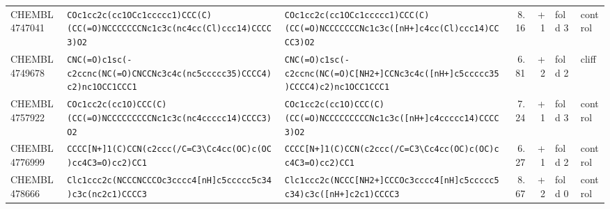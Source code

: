 \begin{longtable}{l p{4.4cm} p{4.4cm} r r l l}
CHEMBL4747041 & \texttt{COc1cc2c(\allowbreak{}cc1OCc1ccccc1)\allowbreak{}CCC(\allowbreak{}C)\allowbreak{}(\allowbreak{}CC(\allowbreak{}=\allowbreak{}O)\allowbreak{}NCCCCCCCNc1c3c(\allowbreak{}nc4cc(\allowbreak{}Cl)\allowbreak{}ccc14)\allowbreak{}CCCC3)\allowbreak{}O2} & \texttt{COc1cc2c(\allowbreak{}cc1OCc1ccccc1)\allowbreak{}CCC(\allowbreak{}C)\allowbreak{}(\allowbreak{}CC(\allowbreak{}=\allowbreak{}O)\allowbreak{}NCCCCCCCNc1c3c(\allowbreak{}[nH+]\allowbreak{}c4cc(\allowbreak{}Cl)\allowbreak{}ccc14)\allowbreak{}CCCC3)\allowbreak{}O2} & 8.16 & +1 & fold 3 & control \\
CHEMBL4749678 & \texttt{CNC(\allowbreak{}=\allowbreak{}O)\allowbreak{}c1sc(\allowbreak{}-c2ccnc(\allowbreak{}NC(\allowbreak{}=\allowbreak{}O)\allowbreak{}CNCCNc3c4c(\allowbreak{}nc5ccccc35)\allowbreak{}CCCC4)\allowbreak{}c2)\allowbreak{}nc1OCC1CCC1} & \texttt{CNC(\allowbreak{}=\allowbreak{}O)\allowbreak{}c1sc(\allowbreak{}-c2ccnc(\allowbreak{}NC(\allowbreak{}=\allowbreak{}O)\allowbreak{}C[NH2+]\allowbreak{}CCNc3c4c(\allowbreak{}[nH+]\allowbreak{}c5ccccc35)\allowbreak{}CCCC4)\allowbreak{}c2)\allowbreak{}nc1OCC1CCC1} & 6.81 & +2 & fold 2 & cliff \\
CHEMBL4757922 & \texttt{COc1cc2c(\allowbreak{}cc1O)\allowbreak{}CCC(\allowbreak{}C)\allowbreak{}(\allowbreak{}CC(\allowbreak{}=\allowbreak{}O)\allowbreak{}NCCCCCCCCCNc1c3c(\allowbreak{}nc4ccccc14)\allowbreak{}CCCC3)\allowbreak{}O2} & \texttt{COc1cc2c(\allowbreak{}cc1O)\allowbreak{}CCC(\allowbreak{}C)\allowbreak{}(\allowbreak{}CC(\allowbreak{}=\allowbreak{}O)\allowbreak{}NCCCCCCCCCNc1c3c(\allowbreak{}[nH+]\allowbreak{}c4ccccc14)\allowbreak{}CCCC3)\allowbreak{}O2} & 7.24 & +1 & fold 3 & control \\
CHEMBL4776999 & \texttt{CCCC[N+]\allowbreak{}1(\allowbreak{}C)\allowbreak{}CCN(\allowbreak{}c2ccc(\allowbreak{}/\allowbreak{}C=\allowbreak{}C3\textbackslash{}Cc4cc(\allowbreak{}OC)\allowbreak{}c(\allowbreak{}OC)\allowbreak{}cc4C3=\allowbreak{}O)\allowbreak{}cc2)\allowbreak{}CC1} & \texttt{CCCC[N+]\allowbreak{}1(\allowbreak{}C)\allowbreak{}CCN(\allowbreak{}c2ccc(\allowbreak{}/\allowbreak{}C=\allowbreak{}C3\textbackslash{}Cc4cc(\allowbreak{}OC)\allowbreak{}c(\allowbreak{}OC)\allowbreak{}cc4C3=\allowbreak{}O)\allowbreak{}cc2)\allowbreak{}CC1} & 6.27 & +1 & fold 2 & control \\
CHEMBL478666 & \texttt{Clc1ccc2c(\allowbreak{}NCCCNCCCOc3cccc4[nH]\allowbreak{}c5ccccc5c34)\allowbreak{}c3c(\allowbreak{}nc2c1)\allowbreak{}CCCC3} & \texttt{Clc1ccc2c(\allowbreak{}NCCC[NH2+]\allowbreak{}CCCOc3cccc4[nH]\allowbreak{}c5ccccc5c34)\allowbreak{}c3c(\allowbreak{}[nH+]\allowbreak{}c2c1)\allowbreak{}CCCC3} & 8.67 & +2 & fold 0 & control \\

\end{longtable}
